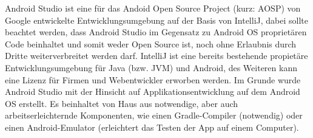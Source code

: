 Android Studio ist eine für das Andoid Open Source Project (kurz: AOSP) von Google entwickelte Entwicklungsumgebung auf der Basis von IntelliJ, dabei sollte beachtet werden, dass Android Studio im Gegensatz zu Android OS
proprietären Code beinhaltet und somit weder Open Source ist, noch ohne Erlaubnis durch Dritte weiterverbreitet werden darf.
IntelliJ ist eine bereits bestehende propietäre Entwicklungsumgebung für Java (bzw. JVM) und Android, des Weiteren kann eine Lizenz für Firmen und Webentwickler erworben werden.
Im Grunde wurde Android Studio mit der Hinsicht auf Applikationsentwicklung auf dem Android OS erstellt. Es beinhaltet von Haus aus notwendige, aber auch arbeitserleichternde Komponenten, wie
einen Gradle-Compiler (notwendig) oder einen Android-Emulator (erleichtert das Testen der App auf einem Computer).\\


